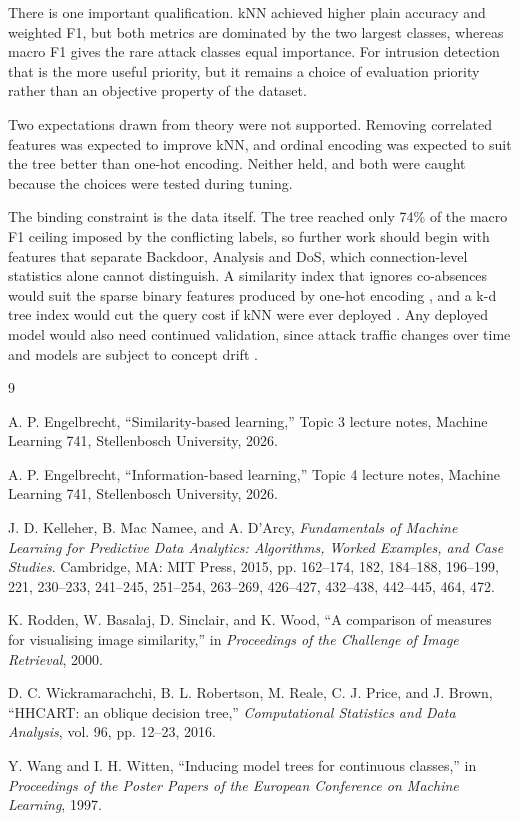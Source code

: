\documentclass[conference]{IEEEtran}
\begin{document}
There is one important qualification. kNN achieved higher plain accuracy and
weighted F1, but both metrics are dominated by the two largest classes, whereas
macro F1 gives the rare attack classes equal importance. For intrusion
detection that is the more useful priority, but it remains a choice of
evaluation priority rather than an objective property of the dataset.

Two expectations drawn from theory were not supported. Removing correlated
features was expected to improve kNN, and ordinal encoding was expected to suit
the tree better than one-hot encoding. Neither held, and both were caught
because the choices were tested during tuning.

The binding constraint is the data itself. The tree reached only 74\% of the
macro F1 ceiling imposed by the conflicting labels, so further work should begin
with features that separate Backdoor, Analysis and DoS, which connection-level
statistics alone cannot distinguish. A similarity index that ignores co-absences
would suit the sparse binary features produced by one-hot encoding
\cite{kelleher2015}, and a k-d tree index would cut the query cost if kNN were
ever deployed \cite{kelleher2015}. Any deployed model would also need continued
validation, since attack traffic changes over time and models are subject to
concept drift \cite{kelleher2015}.

\begin{thebibliography}{9}

A. P. Engelbrecht, ``Similarity-based learning,'' Topic 3 lecture notes, Machine
Learning 741, Stellenbosch University, 2026.

A. P. Engelbrecht, ``Information-based learning,'' Topic 4 lecture notes, Machine
Learning 741, Stellenbosch University, 2026.

J. D. Kelleher, B. Mac Namee, and A. D'Arcy, \textit{Fundamentals of Machine
Learning for Predictive Data Analytics: Algorithms, Worked Examples, and Case
Studies}. Cambridge, MA: MIT Press, 2015, pp. 162--174, 182, 184--188,
196--199, 221, 230--233, 241--245, 251--254, 263--269, 426--427, 432--438,
442--445, 464, 472.

K. Rodden, W. Basalaj, D. Sinclair, and K. Wood, ``A comparison of measures for
visualising image similarity,'' in \textit{Proceedings of the Challenge of Image
Retrieval}, 2000.

D. C. Wickramarachchi, B. L. Robertson, M. Reale, C. J. Price, and J. Brown,
``HHCART: an oblique decision tree,'' \textit{Computational Statistics and Data
Analysis}, vol. 96, pp. 12--23, 2016.

Y. Wang and I. H. Witten, ``Inducing model trees for continuous classes,'' in
\textit{Proceedings of the Poster Papers of the European Conference on Machine
Learning}, 1997.

\end{thebibliography}
\end{document}
